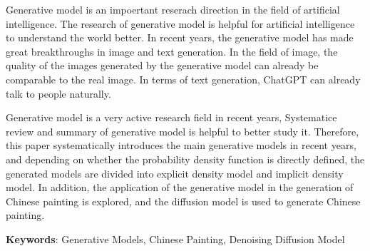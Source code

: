 \newpage
\begin{center}
    \fontsize{18}{1}
\end{center}
\begin{tcolorbox}
\begin{center}
    \fontsize{14}{0}
\end{center}
\vspace{8mm}
\noindent
{\fontsize{16}{0}}
\vspace{2mm}

\setlength{\parindent}{24pt}
Generative model is an impoertant reserach direction in the field of artificial intelligence.
The research of generative model is helpful for artificial intelligence to understand the world better.
In recent years, the generative model has made great breakthroughs in image and text generation.
In the field of image, the quality of the images generated by the generative model can already be comparable to the real image.
In terms of text generation, ChatGPT can already talk to people naturally.

Generative model is a very active research field in recent years,
Systematice review and summary of generative model is helpful to better study it.
Therefore, this paper systematically introduces the main generative models in recent years, 
and depending on whether the probability density function is directly defined,
the generated models are divided into explicit density model and implicit density model.
In addition, the application of the generative model in the generation of Chinese painting is explored, 
and the diffusion model is used to generate Chinese painting.
\vspace{8mm}

\noindent\textbf{Keywords}: Generative Models, Chinese Painting, Denoising Diffusion Model
\end{tcolorbox}

\setlength{\parindent}{24pt}


